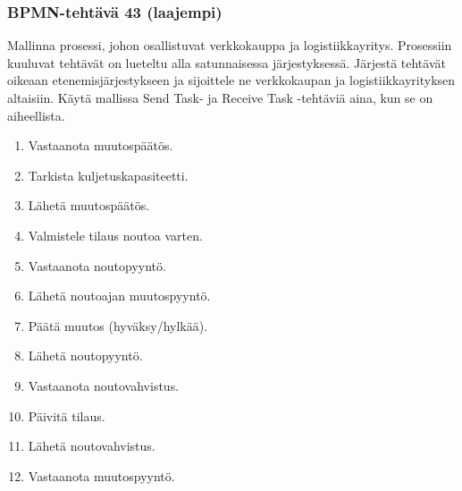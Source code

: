 \documentclass[
  finnish,
  letterpaper,
  DIV=11,
  numbers=noendperiod,
  oneside]{scrreprt}
\providecommand{\tightlist}{%
  \setlength{\itemsep}{0pt}\setlength{\parskip}{0pt}}
\begin{document}
\subsubsection{BPMN-tehtävä 43
(laajempi)}\label{bpmn-tehtuxe4vuxe4-43-laajempi}

Mallinna prosessi, johon osallistuvat verkkokauppa ja logistiikkayritys.
Prosessiin kuuluvat tehtävät on lueteltu alla satunnaisessa
järjestyksessä. Järjestä tehtävät oikeaan etenemisjärjestykseen ja
sijoittele ne verkkokaupan ja logistiikkayrityksen altaisiin. Käytä
mallissa Send Task- ja Receive Task -tehtäviä aina, kun se on
aiheellista.

\begin{enumerate}
\def\labelenumi{\arabic{enumi}.}
\tightlist
\item
  Vastaanota muutospäätös.
\item
  Tarkista kuljetuskapasiteetti.
\item
  Lähetä muutospäätös.
\item
  Valmistele tilaus noutoa varten.
\item
  Vastaanota noutopyyntö.
\item
  Lähetä noutoajan muutospyyntö.
\item
  Päätä muutos (hyväksy/hylkää).
\item
  Lähetä noutopyyntö.
\item
  Vastaanota noutovahvistus.
\item
  Päivitä tilaus.
\item
  Lähetä noutovahvistus.
\item
  Vastaanota muutospyyntö.
\end{enumerate}
\end{document}
